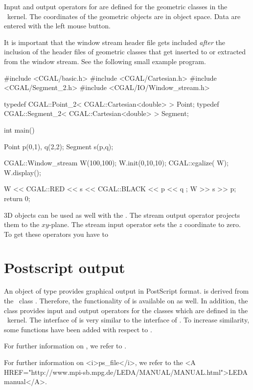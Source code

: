 Input and output operators for  are defined for the geometric 
classes in the \cgal\ kernel.
The coordinates of the geometric objects are in object space. Data are
entered with the left mouse button.

It is important that the window stream header file gets included
{\em after} the inclusion of the header files of geometric classes
that get inserted to or extracted from the window stream. See the following small example
program.

\begin{cprog}

#include <CGAL/basic.h>
#include <CGAL/Cartesian.h>
#include <CGAL/Segment_2.h>
#include <CGAL/IO/Window_stream.h>

typedef CGAL::Point_2< CGAL::Cartesian<double> >     Point;
typedef CGAL::Segment_2< CGAL::Cartesian<double> >   Segment;

int main()
{
    Point p(0,1), q(2,2);
    Segment s(p,q);

    CGAL::Window_stream W(100,100);
    W.init(0,10,10);
    CGAL::cgalize( W);
    W.display();

    W << CGAL::RED << s << CGAL::BLACK << p << q ;
    W >> s >> p;
    return 0;
}
\end{cprog} 

3D objects can be used as well with the . The stream output
operator \ccc{<<} projects them to the $xy$-plane. The stream input
operator \ccc{>>} sets the $z$ coordinate to zero.
To get these operators you have to 



\section{Postscript output}

An object of type  provides graphical output in PostScript
format.
 is derived from the \leda\ class .
Therefore, the functionality of  is available on 
as well.
In addition, the class  provides input and output 
operators for the classes which are defined in the \cgal\ kernel.
The interface of  is very similar to the interface 
of . 
To increase similarity, some functions have been added with respect to .
\begin{ccTexOnly}
For further information on , we refer to \cite{mnsu-lum}.
\end{ccTexOnly}
\begin{ccHtmlOnly}
For further information on <i>ps_file</i>, we refer to the 
<A HREF="http://www.mpi-sb.mpg.de/LEDA/MANUAL/MANUAL.html">LEDA manual</A>.
\end{ccHtmlOnly}

